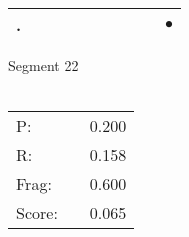 \documentclass[landscape]{article}
\newcommand{\ssp}{\hspace{2pt}}
\newcommand{\mex}{\cellcolor{g}$\bullet$}
\begin{document}
\begin{tabular}{|l|p{10pt}|p{10pt}|p{10pt}|p{10pt}|p{10pt}|p{10pt}|p{10pt}|p{10pt}|p{10pt}|}
\hline
\ssp \cellcolor{ref8}. \ssp&\hspace{2pt}&\hspace{2pt}&\hspace{2pt}&\hspace{2pt}&\hspace{2pt}&\hspace{2pt}&\hspace{2pt}&\hspace{2pt}&\hspace{2pt}\mex\\
\hline
\end{tabular}

\vspace{6pt}
\noindent Segment 22\\\\
\noindent\begin{tabular}{lm{12pt}r}
\hline
P:&&0.200\\
R:&&0.158\\
Frag:&&0.600\\
Score:&&0.065\\
\end{tabular}

\newpage
\end{document}
